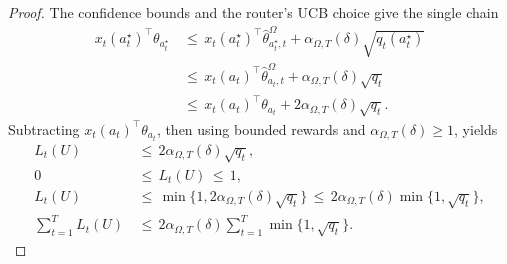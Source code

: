 \documentclass{article} %
\begin{document}
\begin{proof}
The confidence bounds and the router's UCB choice give the single chain
\begin{equation}
\label{eq:hyper-deff-proof-oracle-ucb}
\begin{aligned}
x_t(a_t^\star)^\top\theta_{a_t^\star}
&\,\leq\,
x_t(a_t^\star)^\top\widehat{\theta}_{a_t^\star,t}^{\Omega}
+\alpha_{\Omega,T}(\delta)\sqrt{q_t(a_t^\star)}
\\
&\,\leq\,
x_t(a_t)^\top\widehat{\theta}_{a_t,t}^{\Omega}
+
\alpha_{\Omega,T}(\delta)\sqrt{q_t}
\\
&\,\leq\,
x_t(a_t)^\top\theta_{a_t}
+2\alpha_{\Omega,T}(\delta)\sqrt{q_t}.
\end{aligned}
\end{equation}
Subtracting \(x_t(a_t)^\top\theta_{a_t}\), then using bounded
rewards and \(\alpha_{\Omega,T}(\delta)\geq1\), yields
\begin{equation}
\label{eq:hyper-deff-proof-sum-gap}
\begin{aligned}
L_t(U)
&\,\leq\,
2\alpha_{\Omega,T}(\delta)\sqrt{q_t},
\\
0
&\,\leq\,
L_t(U)
\,\leq\,
1,
\\
L_t(U)
&\,\leq\,
\min\{1,2\alpha_{\Omega,T}(\delta)\sqrt{q_t}\}
\,\leq\,
2\alpha_{\Omega,T}(\delta)\min\{1,\sqrt{q_t}\},
\\
\sum_{t=1}^{T}L_t(U)
&\,\leq\,
2\alpha_{\Omega,T}(\delta)
\sum_{t=1}^{T}\min\{1,\sqrt{q_t}\}.
\end{aligned}
\end{equation}


\end{proof}
\end{document}
